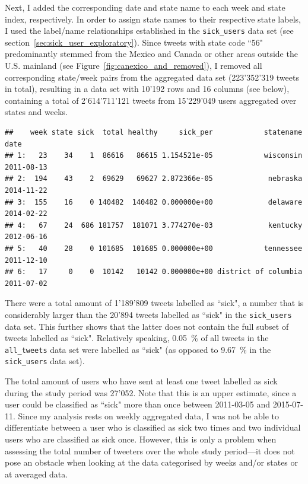\documentclass[11pt, a4paper,twoside]{report}\usepackage[]{graphicx}\usepackage[]{color}
\makeatletter
\newenvironment{kframe}{%
 \def\at@end@of@kframe{}%
 \ifinner\ifhmode%
  \def\at@end@of@kframe{\end{minipage}}%
  \begin{minipage}{\columnwidth}%
 \fi\fi%
 \def\FrameCommand##1{\hskip\@totalleftmargin \hskip-\fboxsep
 \colorbox{shadecolor}{##1}\hskip-\fboxsep
     \hskip-\linewidth \hskip-\@totalleftmargin \hskip\columnwidth}%
 \MakeFramed {\advance\hsize-\width
   \@totalleftmargin\z@ \linewidth\hsize
   \@setminipage}}%
 {\par\unskip\endMakeFramed%
 \at@end@of@kframe}
\newenvironment{knitrout}{}{} %
\makeatother
\begin{document}
Next, I added the corresponding date and state name to each week and state index, respectively. In order to assign state names to their respective state labels, I used the label/name relationships established in the \texttt{sick\_users} data set (see section~\ref{sec:sick_user_exploratory}). Since tweets with state code ``56" predominantly stemmed from the Mexico and Canada or other areas outside the U.S. mainland (see Figure~\ref{fig:canexico_and_removed}), I removed all corresponding state/week pairs from the aggregated data set (223'352'319 tweets in total), resulting in a data set with 10'192 rows and 16 columns (see below), containing a total of 2'614'711'121 tweets from 15'229'049 users aggregated over states and weeks.

\begin{knitrout}
\color{fgcolor}\begin{kframe}
\begin{verbatim}
##    week state sick  total healthy     sick_per            statename       date
## 1:   23    34    1  86616   86615 1.154521e-05            wisconsin 2011-08-13
## 2:  194    43    2  69629   69627 2.872366e-05             nebraska 2014-11-22
## 3:  155    16    0 140482  140482 0.000000e+00             delaware 2014-02-22
## 4:   67    24  686 181757  181071 3.774270e-03             kentucky 2012-06-16
## 5:   40    28    0 101685  101685 0.000000e+00            tennessee 2011-12-10
## 6:   17     0    0  10142   10142 0.000000e+00 district of columbia 2011-07-02
\end{verbatim}
\end{kframe}
\end{knitrout}

There were a total amount of 1'189'809 tweets labelled as ``sick", a number that is considerably larger than the 20'894 tweets labelled as ``sick" in the \texttt{sick\_users} data set. This further shows that the latter does not contain the full subset of tweets labelled as ``sick". Relatively speaking, 0.05~\% of all tweets in the \texttt{all\_tweets} data set were labelled as ``sick" (as opposed to 9.67~\% in the \texttt{sick\_users} data set).

The total amount of users who have sent at least one tweet labelled as sick during the study period was 27'052. Note that this is an upper estimate, since a user could be classified as ``sick" more than once between 2011-03-05 and 2015-07-11. Since my analysis rests on weekly aggregated data, I was not be able to differentiate between a user who is classified as sick two times and two individual users who are classified as sick once. However, this is only a problem when assessing the total number of tweeters over the whole study period---it does not pose an obstacle when looking at the data categorised by weeks and/or states or at averaged data.
\end{document}

